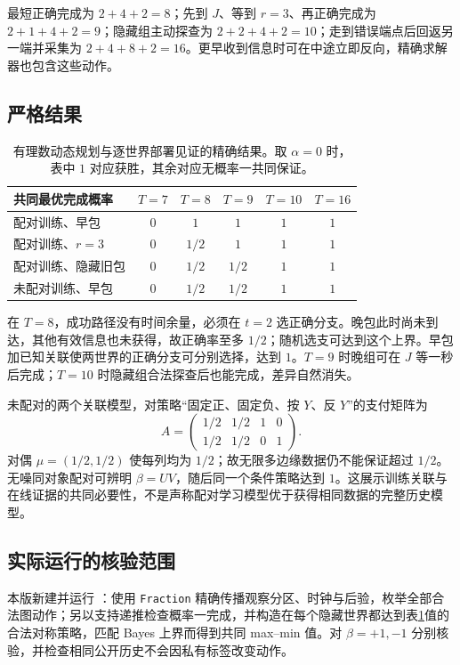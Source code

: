 \documentclass[11pt,a4paper,fontset=fandol]{ctexart}
\theoremstyle{definition}
\theoremstyle{remark}\newtheorem{remark}[theorem]{说明}
\numberwithin{equation}{section}
\begin{document}
最短正确完成为 $2+4+2=8$；先到 $J$、等到 $r=3$、再正确完成为 $2+1+4+2=9$；隐藏组主动探查为 $2+2+4+2=10$；走到错误端点后回返另一端并采集为 $2+4+8+2=16$。更早收到信息时可在中途立即反向，精确求解器也包含这些动作。

\subsection{严格结果}
\begin{table}[htbp]\centering\small
\begin{tabular}{lccccc}\toprule
共同最优完成概率 & $T=7$ & $T=8$ & $T=9$ & $T=10$ & $T=16$\\\midrule
配对训练、早包 & $0$ & $1$ & $1$ & $1$ & $1$\\
配对训练、$r=3$ & $0$ & $1/2$ & $1$ & $1$ & $1$\\
配对训练、隐藏旧包 & $0$ & $1/2$ & $1/2$ & $1$ & $1$\\
未配对训练、早包 & $0$ & $1/2$ & $1/2$ & $1$ & $1$\\\bottomrule
\end{tabular}
\caption{有理数动态规划与逐世界部署见证的精确结果。取 $\alpha=0$ 时，表中 $1$ 对应获胜，其余对应无概率一共同保证。}
\label{tab:graph}
\end{table}
在 $T=8$，成功路径没有时间余量，必须在 $t=2$ 选正确分支。晚包此时尚未到达，其他有效信息也未获得，故正确率至多 $1/2$；随机选支可达到这个上界。早包加已知关联使两世界的正确分支可分别选择，达到 $1$。$T=9$ 时晚组可在 $J$ 等一秒后完成；$T=10$ 时隐藏组合法探查后也能完成，差异自然消失。

未配对的两个关联模型，对策略“固定正、固定负、按 $Y$、反 $Y$”的支付矩阵为
\begin{equation}
 A=\begin{pmatrix}
 1/2&1/2&1&0\\
 1/2&1/2&0&1
 \end{pmatrix}.
 \label{eq:beta_matrix}
\end{equation}
对偶 $\mu=(1/2,1/2)$ 使每列均为 $1/2$；故无限多边缘数据仍不能保证超过 $1/2$。无噪同对象配对可辨明 $\beta=UV$，随后同一个条件策略达到 $1$。这展示训练关联与在线证据的共同必要性，不是声称配对学习模型优于获得相同数据的完整历史模型。

\subsection{实际运行的核验范围}
本版新建并运行 ：使用 \texttt{Fraction} 精确传播观察分区、时钟与后验，枚举全部合法图动作；另以支持递推检查概率一完成，并构造在每个隐藏世界都达到表\ref{tab:graph}值的合法对称策略，匹配 Bayes 上界而得到共同 max--min 值。对 $\beta=+1,-1$ 分别核验，并检查相同公开历史不会因私有标签改变动作。
\end{document}
